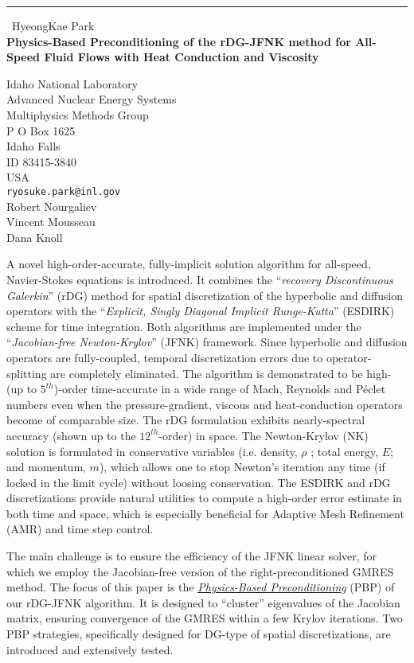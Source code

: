 \documentclass{report}
\begin{document}
\begin{center}
\rule{6in}{1pt} \
{\large HyeongKae Park \\
{\bf Physics-Based Preconditioning of the rDG-JFNK method for All-Speed Fluid Flows with Heat Conduction and Viscosity}}

Idaho National Laboratory \\ Advanced Nuclear Energy Systems \\ Multiphysics Methods Group \\ P O Box 1625 \\ Idaho Falls \\ ID 83415-3840 \\ USA
\\
{\tt ryosuke.park@inl.gov}\\
Robert Nourgaliev\\
Vincent Mousseau\\
	Dana Knoll\end{center}

A novel high-order-accurate, fully-implicit solution algorithm for
all-speed, Navier-Stokes equations is introduced. It combines the
``\textit{recovery Discontinuous Galerkin}'' (rDG) method for spatial
discretization of the hyperbolic and diffusion operators with the
``\textit{Explicit, Singly Diagonal Implicit Runge-Kutta}'' (ESDIRK)
scheme for time integration. Both algorithms are implemented under the
``\textit{Jacobian-free Newton-Krylov}'' (JFNK) framework. Since
hyperbolic and diffusion operators are fully-coupled, temporal
discretization errors due to operator-splitting are completely
eliminated. The algorithm is demonstrated to be high-(up to
$5^{th}$)-order time-accurate in a wide range of Mach, Reynolds and
P\'{e}clet numbers even when the pressure-gradient, viscous and
heat-conduction operators become of comparable size. The rDG formulation
exhibits nearly-spectral accuracy (shown up to the $12^{th}$-order) in
space. The Newton-Krylov (NK) solution is formulated in conservative
variables (i.e. density, $\rho$ ; total energy, $E$; and momentum, $m$),
which allows one to stop Newton's iteration any time (if locked in the
limit cycle) without loosing conservation. The ESDIRK and rDG
discretizations provide natural utilities to compute a high-order error
estimate in both time and space, which is especially beneficial for
Adaptive Mesh Refinement (AMR) and time step control.

The main challenge is to ensure the efficiency of the JFNK linear solver,
for which we employ the Jacobian-free version of the right-preconditioned
GMRES method. The focus of this paper is the
\textit{\underline{Physics-Based Preconditioning}} (PBP) of our rDG-JFNK
algorithm. It is designed to ``cluster'' eigenvalues of the Jacobian
matrix, ensuring convergence of the GMRES within a few Krylov iterations.
Two PBP strategies, specifically designed for DG-type of spatial
discretizations, are introduced and extensively tested.
\end{document}
